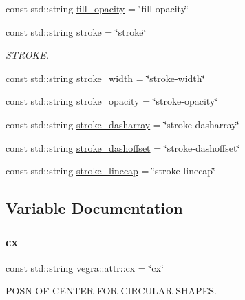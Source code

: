 \begin{DoxyCompactItemize}
const std\+::string \mbox{\hyperlink{namespacevegra_1_1attr_a9d77466dca979b9cebbcac29c4a86c28}{fill\+\_\+opacity}} = \char`\"{}fill-\/opacity\char`\"{}
\item 
const std\+::string \mbox{\hyperlink{namespacevegra_1_1attr_a547c61d63fa7cd98b099cfddda3e900f}{stroke}} = \char`\"{}stroke\char`\"{}
\begin{DoxyCompactList}\small\item\em S\+T\+R\+O\+KE. \end{DoxyCompactList}\item 
const std\+::string \mbox{\hyperlink{namespacevegra_1_1attr_afaba5780f0fd064b750037b66af7d6a0}{stroke\+\_\+width}} = \char`\"{}stroke-\/\mbox{\hyperlink{namespacevegra_1_1attr_ad16d3f19ee0c2bc1624c97839c99dad6}{width}}\char`\"{}
\item 
const std\+::string \mbox{\hyperlink{namespacevegra_1_1attr_a38bbcd92795d4200270ffb0cc654b396}{stroke\+\_\+opacity}} = \char`\"{}stroke-\/opacity\char`\"{}
\item 
const std\+::string \mbox{\hyperlink{namespacevegra_1_1attr_a19195ef7c83cf394bf879490c05ff279}{stroke\+\_\+dasharray}} = \char`\"{}stroke-\/dasharray\char`\"{}
\item 
const std\+::string \mbox{\hyperlink{namespacevegra_1_1attr_a58600e14ff5c6f05ce98fb91bbd0ecb3}{stroke\+\_\+dashoffset}} = \char`\"{}stroke-\/dashoffset\char`\"{}
\item 
const std\+::string \mbox{\hyperlink{namespacevegra_1_1attr_a01f922256bd62abf2554d5438fda3b62}{stroke\+\_\+linecap}} = \char`\"{}stroke-\/linecap\char`\"{}
\end{DoxyCompactItemize}


\subsection{Variable Documentation}
\mbox{\label{namespacevegra_1_1attr_a2b00c1ce5fbfd6f287f04c82436cde36}} 
\subsubsection{\texorpdfstring{cx}{cx}}
{\footnotesize\ttfamily const std\+::string vegra\+::attr\+::cx = \char`\"{}cx\char`\"{}}



P\+O\+SN OF C\+E\+N\+T\+ER F\+OR C\+I\+R\+C\+U\+L\+AR S\+H\+A\+P\+ES. 

